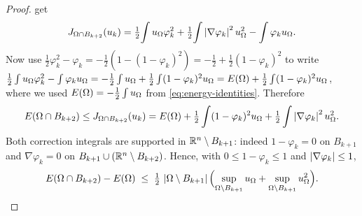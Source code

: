 \begin{proof}
get
\[
   J_{\Omega\cap B_{k+2}}(u_k)
   =\tfrac12\!\int u_\Omega\varphi_k^2
   +\tfrac12\!\int\left|\nabla\varphi_k\right|^2u_\Omega^2
   -\int\varphi_k u_\Omega .
\]
Now use $\tfrac12\varphi_k^2-\varphi_k=-\tfrac12(1-(1-\varphi_k)^2)
=-\tfrac12+\tfrac12(1-\varphi_k)^2$ to write
$\tfrac12\int u_\Omega\varphi_k^2-\int\varphi_k u_\Omega
=-\tfrac12\int u_\Omega+\tfrac12\int(1-\varphi_k)^2u_\Omega
=E(\Omega)+\tfrac12\int(1-\varphi_k)^2u_\Omega$, where we used
$E(\Omega)=-\tfrac12\int u_\Omega$ from \eqref{eq:energy-identities}.
Therefore
\begin{equation}\label{eq:energy-exact}
   E(\Omega\cap B_{k+2})\le J_{\Omega\cap B_{k+2}}(u_k)
   =E(\Omega)+\tfrac12\int(1-\varphi_k)^2u_\Omega
          +\tfrac12\int\left|\nabla\varphi_k\right|^2u_\Omega^2 .
\end{equation}
Both correction integrals are supported in $\mathbb R^n\setminus B_{k+1}$:
indeed $1-\varphi_k=0$ on $B_{k+1}$ and $\nabla\varphi_k=0$ on
$B_{k+1}\cup(\mathbb R^n\setminus B_{k+2})$. Hence, with $0\le1-\varphi_k\le1$
and $\left|\nabla\varphi_k\right|\le1$,
\begin{equation}\label{eq:energy-comp-pre}
   E(\Omega\cap B_{k+2})-E(\Omega)
   \;\le\;\tfrac12\,\left|\Omega\setminus B_{k+1}\right|
   \Bigl(\sup_{\Omega\setminus B_{k+1}}u_\Omega
        +\sup_{\Omega\setminus B_{k+1}}u_\Omega^2\Bigr).
\end{equation}

\end{proof}
